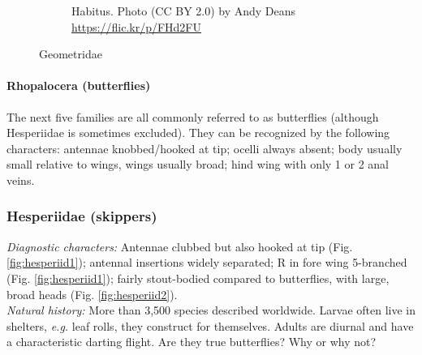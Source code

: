\documentclass[letterpaper, 11pt]{article}
\begin{document}
\begin{figure}[ht!]
\begin{subfigure}[ht!]{0.48\textwidth}
        \caption{Habitus. Photo (CC BY 2.0) by Andy Deans \url{https://flic.kr/p/FHd2FU}}
        \label{fig:geometrid2}
    \end{subfigure}
    \caption{Geometridae}\label{fig:geometrids}
\end{figure}

\FloatBarrier
\paragraph{Rhopalocera (butterflies)} The next five families are all commonly referred to as butterflies (although Hesperiidae is sometimes excluded). They can be recognized by the following characters: antennae knobbed/hooked at tip; ocelli always absent; body usually small relative to wings, wings usually broad; hind wing with only 1 or 2 anal veins.

\subsubsection{Hesperiidae (skippers)}
\noindent{}\textit{Diagnostic characters:} Antennae clubbed but also hooked at tip (Fig. \ref{fig:hesperiid1}); antennal insertions widely separated; R in fore wing 5-branched (Fig. \ref{fig:hesperiid1}); fairly stout-bodied compared to butterflies, with large, broad heads (Fig. \ref{fig:hesperiid2}).\\

\noindent{}\textit{Natural history:} More than 3,500 species described worldwide. Larvae often live in shelters, \textit{e.g.} leaf rolls, they construct for themselves. Adults are diurnal and have a characteristic darting flight. Are they true butterflies? Why or why not?
\end{document}
